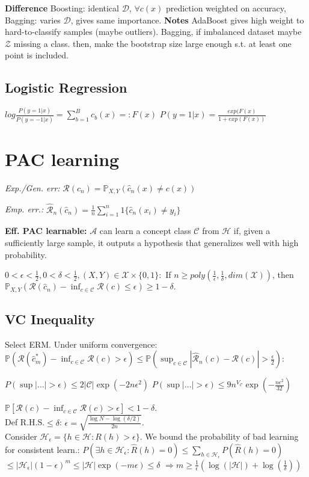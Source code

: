 \textbf{Difference}
Boosting: identical $\mathcal{D}$, $\forall c(x)$ prediction weighted on accuracy, Bagging: varies $\mathcal{D}$, gives same importance.
\textbf{Notes}
AdaBoost gives high weight to hard-to-classify samples (maybe outliers). Bagging, if imbalanced dataset maybe $\mathcal{Z}$ missing a class. then, make the bootstrap size large enough s.t. at least one point is included.
\subsection*{Logistic Regression}
$log\frac{P(y=1|x)}{P(y=-1|x)} = \sum_{b=1}^Bc_b(x) =: F(x)$
$P(y=1|x) = \frac{exp(F(x)}{1+exp(F(x))}$

\section*{PAC learning}

\textit{Exp./Gen. err:} $\mathcal{R}(\hat{c}_n) {=} \mathbb{P}_{X,Y} (\hat{c}_n (x) {\neq} c(x))$

\textit{Emp. err.:} $\hat{\mathcal{R}}_n (\hat{c}_n) {=} \frac{1}{n} \sum_{i=1}^{n} 1\{\hat{c}_n (x_i) \neq y_i\}$

\textbf{Eff. PAC learnable:} $\mathcal{A}$ can learn a concept class $\mathcal{C}$ from $\mathcal{H}$ if, given a sufficiently large sample, it outputs a hypothesis that generalizes well with high probability.

$0 {<} \epsilon {<} \frac{1}{2},  0 {<} \delta {<} \frac{1}{2},  (X,Y) \in \mathcal{X} {\times} \{0,1\}:$
If $n \geq poly( \frac{1}{\epsilon}, \frac{1}{\delta}, dim(\mathcal{X}) )$, then
$\mathbb{P}_{X,Y} ( \mathcal{R}(\hat{c}_n) {-} \inf_{c \in \mathcal{C}} \mathcal{R}(c) {\leq} \epsilon ) {\geq} 1 {-} \delta.$


\subsection*{VC Inequality}
Select ERM. Under uniform convergence:
$\mathbb{P} \left( \mathcal{R}(\hat{c}_m^*) - \inf_{c \in \mathcal{C}} \mathcal{R}(c) > \epsilon \right) \leq \mathbb{P} \left( \sup_{c \in \mathcal{C}} |\hat{\mathcal{R}}_n (c) - \mathcal{R}(c)| > \frac{\epsilon}{2} \right)$:

$P(\sup |\dots| > \epsilon) \leq 2 |\mathcal{C}| \exp(-2n\epsilon^2)$
$P(\sup |\dots| > \epsilon) \leq 9 n^{V_{\mathcal{C}}} \exp \left( - \frac{n \epsilon^2}{32} \right)$


$\mathbb{P}[\mathcal{R}(\hat{c})-\inf_{c\in\mathcal{C}}\mathcal{R}(c)>\epsilon]<1-\delta$.\\
Def R.H.S.${\leq}\delta$: $\epsilon{=}\sqrt{\frac{\log N - \log(\delta/2)}{2n}}$. \\
Consider $\mathcal{H}_\epsilon {=} \{ h {\in} \mathcal{H} : R(h) {>} \epsilon \}$. 
We bound the probability of bad learning for consistent learn.: 
$P(\exists h \in \mathcal{H}_\epsilon : \hat{R}(h) = 0) \leq \sum_{h \in \mathcal{H}_\epsilon} P(\hat{R}(h) = 0) $
$\leq |\mathcal{H}_\epsilon| (1 - \epsilon)^m \leq |\mathcal{H}| \exp(-m\epsilon) \leq \delta$
$\Rightarrow m \geq \frac{1}{\epsilon} \left( \log(|\mathcal{H}|) + \log \left( \frac{1}{\delta} \right) \right)$




